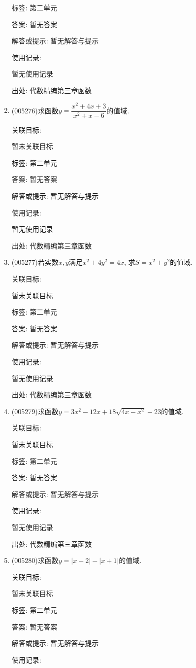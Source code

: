 \documentclass[10pt,a4paper]{article}
\begin{document}
\begin{enumerate}[1.]
标签: 第二单元

答案: 暂无答案

解答或提示: 暂无解答与提示

使用记录:

暂无使用记录


出处: 代数精编第三章函数
\item { (005276)}求函数$y=\dfrac{x^2+4x+3}{x^2+x-6}$的值域.


关联目标:

暂未关联目标



标签: 第二单元

答案: 暂无答案

解答或提示: 暂无解答与提示

使用记录:

暂无使用记录


出处: 代数精编第三章函数
\item { (005277)}若实数$x,y$满足$x^2+4y^2=4x$, 求$S=x^2+y^2$的值域.


关联目标:

暂未关联目标



标签: 第二单元

答案: 暂无答案

解答或提示: 暂无解答与提示

使用记录:

暂无使用记录


出处: 代数精编第三章函数
\item { (005279)}求函数$y=3x^2-12x+18\sqrt {4x-x^2}-23$的值域.


关联目标:

暂未关联目标



标签: 第二单元

答案: 暂无答案

解答或提示: 暂无解答与提示

使用记录:

暂无使用记录


出处: 代数精编第三章函数
\item { (005280)}求函数$y=|x-2|-|x+1|$的值域.


关联目标:

暂未关联目标



标签: 第二单元

答案: 暂无答案

解答或提示: 暂无解答与提示

使用记录:


\end{enumerate}
\end{document}
